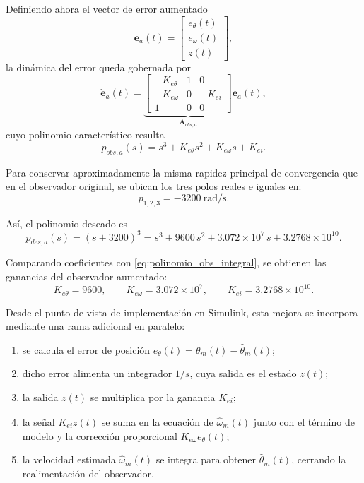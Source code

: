 \documentclass[12pt, a4paper,journal, onecolumn, compsoc]{IEEEtran}
\begin{document}
Definiendo ahora el vector de error aumentado
\begin{equation}
\mathbf e_a(t)=
\begin{bmatrix}
e_\theta(t)\\
e_\omega(t)\\
z(t)
\end{bmatrix},
\end{equation}
la dinámica del error queda gobernada por
\begin{equation}
\dot{\mathbf e}_a(t)=
\underbrace{
\begin{bmatrix}
-K_{e\theta} & 1 & 0\\
-K_{e\omega} & 0 & -K_{ei}\\
1 & 0 & 0
\end{bmatrix}
}_{\mathbf A_{obs,a}}
\mathbf e_a(t),
\end{equation}
cuyo polinomio característico resulta
\begin{equation}
\label{eq:polinomio_obs_integral}
p_{obs,a}(s)=s^3+K_{e\theta}s^2+K_{e\omega}s+K_{ei}.
\end{equation}

Para conservar aproximadamente la misma rapidez principal de convergencia que en el observador original, se ubican los tres polos reales e iguales en:
\begin{equation}
p_{1,2,3}=-3200\ \text{rad/s}.
\end{equation}

Así, el polinomio deseado es
\begin{equation}
p_{des,a}(s)=(s+3200)^3
=s^3+9600\,s^2+3.072\times10^7\,s+3.2768\times10^{10}.
\end{equation}

Comparando coeficientes con \eqref{eq:polinomio_obs_integral}, se obtienen las ganancias del observador aumentado:
\begin{equation}
\label{eq:ganancias_obs_integral}
K_{e\theta}=9600,
\qquad
K_{e\omega}=3.072\times10^7,
\qquad
K_{ei}=3.2768\times10^{10}.
\end{equation}

Desde el punto de vista de implementación en Simulink, esta mejora se incorpora mediante una rama adicional en paralelo:
\begin{enumerate}
    \item se calcula el error de posición $e_{\theta}(t)=\theta_m(t)-\hat{\theta}_m(t)$;

    \item dicho error alimenta un integrador $1/s$, cuya salida es el estado $z(t)$;
    \item la salida $z(t)$ se multiplica por la ganancia $K_{ei}$;
    \item la señal $K_{ei}z(t)$ se suma en la ecuación de $\dot{\hat{\omega}}_m(t)$ junto con el término de modelo y la corrección proporcional $K_{e\omega}e_{\theta}(t)$;
    \item la velocidad estimada $\hat{\omega}_m(t)$ se integra para obtener $\hat{\theta}_m(t)$, cerrando la realimentación del observador.
\end{enumerate}
\end{document}
